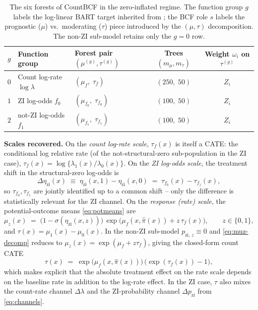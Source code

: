 \documentclass[11pt]{article}
\theoremstyle{plain}
\theoremstyle{definition}
\theoremstyle{remark}
\newcommand{\muF}{\mu_f}
\newcommand{\tauF}{\tau_f}
\newcommand{\muz}{\mu_{z}}
\newcommand{\muone}{\mu_{1}}
\newcommand{\muzero}{\mu_{0}}
\newcommand{\tauresp}{\tau}                 %
\newcommand{\pihat}{\widehat{\pi}}
\newcommand{\pzi}[1][z]{p_{\mathrm{zi},\,#1}}
\newcommand{\etazi}{\eta_{\mathrm{zi}}}
\newcommand{\Detazi}{\Delta\etazi}
\newcommand{\fzeroSym}{f_{0}}
\newcommand{\foneSym}{f_{1}}
\newcommand{\muFzero}{\mu_{f_{0}}}
\newcommand{\muFone}{\mu_{f_{1}}}
\newcommand{\tauFzero}{\tau_{f_{0}}}
\newcommand{\tauFone}{\tau_{f_{1}}}
\newcommand{\omegai}{\omega_{i}}
\newcommand{\Deltalam}{\Delta\lambda}
\newcommand{\Deltapzi}{\Delta p_{\mathrm{zi}}}
\begin{document}
\begin{table}[t]
\centering
\caption{The six forests of CountBCF in the zero-inflated regime. The
function group $g$ labels the log-linear BART target inherited from
\citet{murray2021loglinear}; the BCF role $s$ labels the prognostic
($\mu$) vs.\ moderating ($\tau$) piece introduced by the
$(\mu, \tau)$ decomposition. The non-ZI sub-model retains only the
$g = 0$ row.}
\label{tab:zicountbcf-forests}
\begin{tabular}{cllcc}
\toprule
$g$ & Function group & Forest pair $(\mu^{(g)}, \tau^{(g)})$
                                                      & Trees $(m_\mu, m_\tau)$ & Weight $\omegai$ on $\tau^{(g)}$ \\
\midrule
$0$ & Count log-rate $\log\lambda$           & $(\muF,\; \tauF)$
                                                      & $(250,\; 50)$ & $Z_i$ \\
$1$ & ZI log-odds $\fzeroSym$                & $(\muFzero,\; \tauFzero)$
                                                      & $(100,\; 50)$ & $Z_i$ \\
$2$ & not-ZI log-odds $\foneSym$             & $(\muFone,\; \tauFone)$
                                                      & $(100,\; 50)$ & $Z_i$ \\
\bottomrule
\end{tabular}
\end{table}

\medskip
\noindent\textbf{Scales recovered.}
On the \emph{count log-rate scale}, $\tauF(x)$ is itself a CATE: the
conditional log relative rate (of the not-structural-zero
sub-population in the ZI case),
$\tauF(x) = \log\{\lambda_1(x) / \lambda_0(x)\}$. On the \emph{ZI
log-odds scale}, the treatment shift in the structural-zero log-odds
is
\begin{equation}
  \Detazi(x)
  \;\equiv\;
  \etazi(x, 1) - \etazi(x, 0)
  \;=\;
  \tauFzero(x) - \tauFone(x),
  \label{eq:Deltaeta-decomp}
\end{equation}
so $\tauFzero, \tauFone$ are jointly identified up to a common shift
-- only the difference is statistically relevant for the ZI channel.
On the \emph{response (rate) scale}, the potential-outcome means
\eqref{eq:potmeans} are
\begin{equation}
  \muz(x)
  \;=\;
  \bigl(1 - \sigma(\etazi(x, z))\bigr)\,
  \exp\!\bigl(\muF(x, \pihat(x)) + z\, \tauF(x)\bigr),
  \qquad z \in \{0, 1\},
  \label{eq:muz-decomp}
\end{equation}
and $\tauresp(x) = \muone(x) - \muzero(x)$. In the non-ZI sub-model
$\pzi \equiv 0$ and \eqref{eq:muz-decomp} reduces to
$\muz(x) = \exp(\muF + z\tauF)$, giving the closed-form count CATE
\begin{equation}
  \tauresp(x)
  \;=\;
  \exp\!\bigl(\muF(x, \pihat(x))\bigr)\,
  \bigl(\exp(\tauF(x)) - 1\bigr),
  \label{eq:tauresp-decomp}
\end{equation}
which makes explicit that the absolute treatment effect on the rate
scale depends on the baseline rate in addition to the log-rate
effect. In the ZI case, $\tauresp$ also mixes the count-rate channel
$\Deltalam$ and the ZI-probability channel $\Deltapzi$ from
\eqref{eq:channels}.
\end{document}
